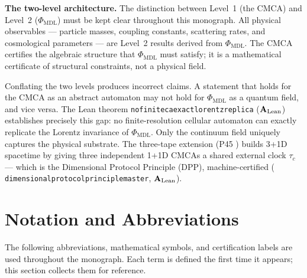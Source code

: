 \documentclass[11pt,openany]{book}
\theoremstyle{remark}
\newcommand{\PHIMDL}{\Phi_{\mathrm{MDL}}}
\newcommand{\lean}[1]{%
  \penalty-100
  \begingroup\def\_{\textunderscore\allowbreak}\texttt{#1}\endgroup}
\newcommand{\CatAL}{\ensuremath{\textbf{A}_{\rm Lean}}}
\begin{document}
\medskip

\noindent\textbf{The two-level architecture.}\enspace
The distinction between Level~1 (the CMCA) and Level~2 ($\PHIMDL$) must be kept clear
throughout this monograph.
All physical observables --- particle masses, coupling constants, scattering rates,
and cosmological parameters --- are Level~2 results derived from $\PHIMDL$.
The CMCA certifies the algebraic structure that $\PHIMDL$ must satisfy; it is a
mathematical certificate of structural constraints, not a physical field.

Conflating the two levels produces incorrect claims.
A statement that holds for the CMCA as an abstract automaton may not hold for $\PHIMDL$
as a quantum field, and vice versa.
The Lean theorem \lean{no\_finite\_ca\_exact\_lorentz\_replica} (\CatAL) establishes
precisely this gap: no finite-resolution cellular automaton can exactly replicate the
Lorentz invariance of $\PHIMDL$.
Only the continuum field uniquely captures the physical substrate.
The three-tape extension (P45 \cite{SpivackThreeTapeCMCA}) builds 3+1D spacetime by
giving three independent 1+1D CMCAs a shared external clock $\tau_c$ --- which is the
Dimensional Protocol Principle (DPP), machine-certified
(\lean{dimensional\_protocol\_principle\_master}, \CatAL).

\section{Notation and Abbreviations}
\label{sec:notation}

The following abbreviations, mathematical symbols, and certification labels are used
throughout the monograph.
Each term is defined the first time it appears; this section collects them for reference.
\end{document}
